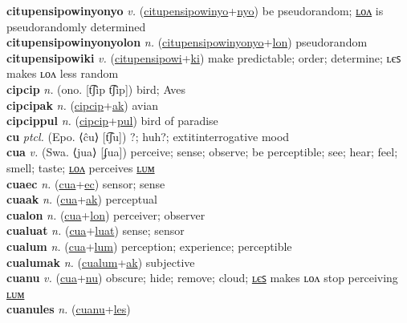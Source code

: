 \textbf{citupensipowinyonyo} \textit{v.} (\hyperref[citupensipowinyo]{citupensipowinyo}+\hyperref[nyo]{nyo})
be pseudorandom; \hyperref[citupensipowinyonyolon]{ʟᴏᴧ} is pseudorandomly determined \label{citupensipowinyonyo} \\
\textbf{citupensipowinyonyolon} \textit{n.} (\hyperref[citupensipowinyonyo]{citupensipowinyonyo}+\hyperref[lon]{lon})
pseudorandom \label{citupensipowinyonyolon} \\
\textbf{citupensipowiki} \textit{v.} (\hyperref[citupensipowi]{citupensipowi}+\hyperref[ki]{ki})
make predictable; order; determine; ʟєꜱ makes ʟᴏᴧ less random \label{citupensipowiki} \\
\textbf{cipcip} \textit{n.} (ono. [t͡ʃip t͡ʃip])
bird; Aves \label{cipcip} \\
\textbf{cipcipak} \textit{n.} (\hyperref[cipcip]{cipcip}+\hyperref[ak]{ak})
avian \label{cipcipak} \\
\textbf{cipcippul} \textit{n.} (\hyperref[cipcip]{cipcip}+\hyperref[pul]{pul})
bird of paradise \label{cipcippul} \\
\textbf{cu} \textit{ptcl.} (Epo. ⟨ĉu⟩ [t͡ʃu])
?; huh?; 	extit{interrogative mood} \label{cu} \\
\textbf{cua} \textit{v.} (Swa. ⟨jua⟩ [ʄua])
perceive; sense; observe; be perceptible; see; hear; feel; smell; taste; \hyperref[cualon]{ʟᴏᴧ} perceives \hyperref[cualum]{ʟᴜᴍ} \label{cua} \\
\textbf{cuaec} \textit{n.} (\hyperref[cua]{cua}+\hyperref[ec]{ec})
sensor; sense \label{cuaec} \\
\textbf{cuaak} \textit{n.} (\hyperref[cua]{cua}+\hyperref[ak]{ak})
perceptual \label{cuaak} \\
\textbf{cualon} \textit{n.} (\hyperref[cua]{cua}+\hyperref[lon]{lon})
perceiver; observer \label{cualon} \\
\textbf{cualuat} \textit{n.} (\hyperref[cua]{cua}+\hyperref[luat]{luat})
sense; sensor \label{cualuat} \\
\textbf{cualum} \textit{n.} (\hyperref[cua]{cua}+\hyperref[lum]{lum})
perception; experience; perceptible \label{cualum} \\
\textbf{cualumak} \textit{n.} (\hyperref[cualum]{cualum}+\hyperref[ak]{ak})
subjective \label{cualumak} \\
\textbf{cuanu} \textit{v.} (\hyperref[cua]{cua}+\hyperref[nu]{nu})
obscure; hide; remove; cloud; \hyperref[cuanules]{ʟєꜱ} makes ʟᴏᴧ stop perceiving \hyperref[cuanulum]{ʟᴜᴍ} \label{cuanu} \\
\textbf{cuanules} \textit{n.} (\hyperref[cuanu]{cuanu}+\hyperref[les]{les})

